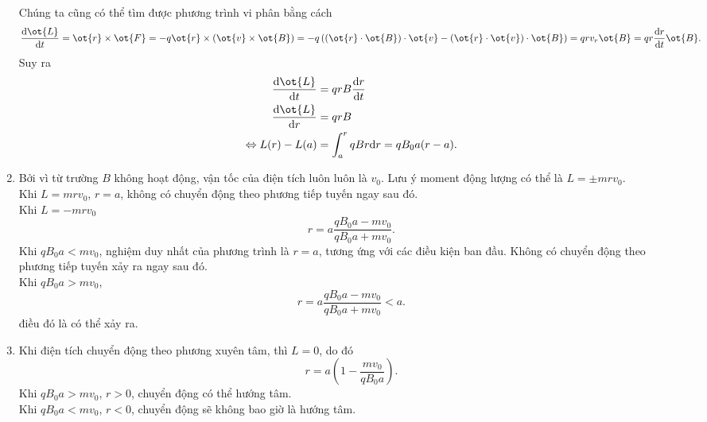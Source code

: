 \begin{loigiai}
\begin{enumerate}[1) ]
\begin{center}
    \end{center}
    Chúng ta cũng có thể tìm được phương trình vi phân bằng cách
    \[\dfrac{\mathrm{d}\ot{L}}{\mathrm{d}t}=\ot{r}\times\ot{F}=-q\ot{r}\times(\ot{v}\times\ot{B})=-q\left((\ot{r}\cdot\ot{B})\cdot\ot{v}-(\ot{r}\cdot\ot{v})\cdot\ot{B}\right)=qrv_{r}\ot{B}=qr\dfrac{\mathrm{d}r}{\mathrm{d}t}\ot{B}.\]
    Suy ra
    \begin{align*}
       \dfrac{\mathrm{d}\ot{L}}{\mathrm{d}t} &=qrB\dfrac{\mathrm{d}r}{\mathrm{d}t}\\
       \dfrac{\mathrm{d}\ot{L}}{\mathrm{d}r} &=qrB\\
        \Leftrightarrow L(r)-L(a)&=\int_{a}^{r}qBr\mathrm{d}r=qB_0a(r-a).
    \end{align*} 
    \item Bởi vì từ trường $B$ không hoạt động, vận tốc của điện tích luôn luôn là $v_0$. Lưu ý moment động lượng có thể là $L=\pm mrv_0$.\\
    Khi $L=mrv_0$, $r=a$, không có chuyển động theo phương tiếp tuyến ngay sau đó.\\
    Khi $L=-mrv_0$
    \[r=a\dfrac{qB_0a-mv_0}{qB_0a+mv_0}.\]
    Khi $qB_0a<mv_0$, nghiệm duy nhất của phương trình là $r=a$, tương ứng với các điều kiện ban đầu. Không có chuyển động theo phương tiếp tuyến xảy ra ngay sau đó.\\
    Khi $qB_0a>mv_0$,
    \[r=a\dfrac{qB_0a-mv_0}{qB_0a+mv_0}<a.\]
    điều đó là có thể xảy ra.
    \item Khi điện tích chuyển động theo phương xuyên tâm, thì $L=0$, do đó
    \[r=a\left(1-\dfrac{mv_0}{qB_0a}\right).\]
    Khi $qB_0a>mv_0$, $r>0$, chuyển động có thể hướng tâm.\\
    Khi $qB_0a<mv_0$, $r<0$, chuyển động sẽ không bao giờ là hướng tâm.
\end{enumerate}
\end{loigiai}



